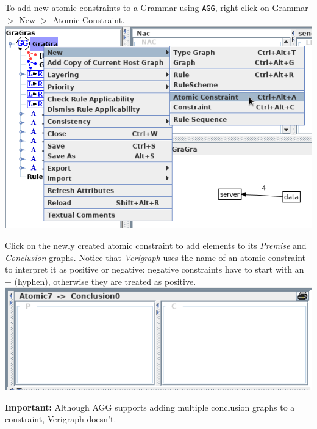 \documentclass[12pt]{article}
\newenvironment{tutorialstep}
	{\hspace{-\parindent}\begin{minipage}{\textwidth}}
    {\vspace{.3cm}\end{minipage}}
\begin{document}
\begin{tutorialstep}
To add new atomic constraints to a Grammar using \texttt{AGG}, right-click on Grammar $>$ New $>$ Atomic Constraint. \\

  \noindent
  \centering
  \includegraphics[scale = 0.6]{atomic_constraints01.png}
\end{tutorialstep}

\begin{tutorialstep}
Click on the newly created atomic constraint to add elements to its \emph{Premise} and \emph{Conclusion} graphs. Notice that  \emph{Verigraph} uses the name of an atomic constraint to interpret it as positive or negative: negative constraints have to start with an $-$ (hyphen), otherwise they are treated as positive. \\

  \noindent
  \centering
  \includegraphics[scale = 0.6]{new_atomic}
  
\end{tutorialstep}

\pagebreak
\noindent
\textbf{Important:} Although AGG supports adding multiple conclusion graphs to a constraint, Verigraph doesn't.\\
\end{document}
